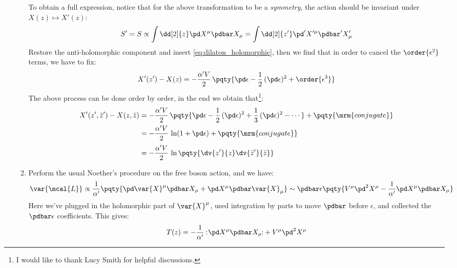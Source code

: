 \documentclass[a4paper,10pt]{article}
\begin{document}
\begin{enumerate}
\begin{enumerate}
	To obtain a full expression, notice that for the above transformation to be a \textit{symmetry}, the action should be invariant under $X(z)\mapsto X'(z)$:
	\begin{equation}
		S' = S
		\propto \int \dd[2]{z}
			\pd X^\mu \pdbar X_\mu
		= \int \dd[2]{z'}
			\pd' X'^\mu \pdbar' X'_\mu
	\end{equation}
	Restore the anti-holomorphic component and insert \eqref{eq:dilaton_holomorphic}, then we find that in order to cancel the $\order{\epsilon^2}$ terms, we have to fix:
	\begin{equation}
		X'(z') - X(z)
		= -\frac{\alpha' V}{2}\,\pqty{
			\pd\epsilon
			- \frac{1}{2}\,(\pd\epsilon)^2
			+ \order{\epsilon^3}
		}
	\end{equation}
	The above process can be done order by order, in the end we obtain that\footnote{
		I would like to thank Lucy Smith for helpful discussions. 
	}:
	\begin{equation}
	\begin{aligned}
		X'(z',\bar{z}') - X(z,\bar{z})
		&= -\frac{\alpha' V}{2}\,\pqty{
			\pd\epsilon
			- \frac{1}{2}\,(\pd\epsilon)^2
			+ \frac{1}{3}\,(\pd\epsilon)^2
			- \cdots
		} + \pqty{\mrm{conjugate}} \\
		&= -\frac{\alpha' V}{2}\,
			\ln (1 + \pd\epsilon)
		+ \pqty{\mrm{conjugate}} \\[.5ex]
		&= -\frac{\alpha' V}{2}\,
			\ln \pqty{
				\dv{z'}{z}
				\dv{\bar{z}'}{\bar{z}}
			}
	\end{aligned}
	\end{equation}
	
	
	\item Perform the usual Noether's procedure on the free boson action, and we have:
	\begin{equation}
		\var{\mcal{L}}
		\propto \frac{1}{\alpha'} \pqty{
				\pd \var{X}^\mu \pdbar X_\mu
				+ \pd X^\mu \pdbar \var{X}_\mu
			}
		\sim \pdbar \epsilon \pqty{
			V^\mu \pd^2 X^\mu
			- \frac{1}{\alpha'}
				\pd X^\mu \pdbar X_\mu
		}
	\end{equation}
	Here we've plugged in the holomorphic part of $\var{X}^\mu$, used integration by parts to move $\pdbar$ before $\epsilon$, and collected the $\pdbar\epsilon$ coefficients. This gives:
	\begin{equation}
		T(z) = - \frac{1}{\alpha'}\,\normorder{
				\pd X^\mu \pdbar X_\mu\!
			} + V^\mu \pd^2 X^\mu
	\end{equation}
	

\end{enumerate}
\end{enumerate}
\end{document}
